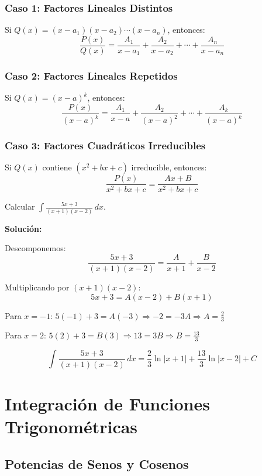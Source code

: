 \documentclass[12pt, a4paper]{book}
\begin{document}
\subsubsection{Caso 1: Factores Lineales Distintos}

Si $Q(x) = (x-a_1)(x-a_2)\cdots(x-a_n)$, entonces:
\[
\frac{P(x)}{Q(x)} = \frac{A_1}{x-a_1} + \frac{A_2}{x-a_2} + \cdots + \frac{A_n}{x-a_n}
\]

\subsubsection{Caso 2: Factores Lineales Repetidos}

Si $Q(x) = (x-a)^k$, entonces:
\[
\frac{P(x)}{(x-a)^k} = \frac{A_1}{x-a} + \frac{A_2}{(x-a)^2} + \cdots + \frac{A_k}{(x-a)^k}
\]

\subsubsection{Caso 3: Factores Cuadráticos Irreducibles}

Si $Q(x)$ contiene $(x^2+bx+c)$ irreducible, entonces:
\[
\frac{P(x)}{x^2+bx+c} = \frac{Ax+B}{x^2+bx+c}
\]

\begin{ejemplo}
Calcular $\int \frac{5x+3}{(x+1)(x-2)} \, dx$.

\textbf{Solución:}

Descomponemos:
\[
\frac{5x+3}{(x+1)(x-2)} = \frac{A}{x+1} + \frac{B}{x-2}
\]

Multiplicando por $(x+1)(x-2)$:
\[
5x+3 = A(x-2) + B(x+1)
\]

Para $x = -1$: $5(-1)+3 = A(-3) \Rightarrow -2 = -3A \Rightarrow A = \frac{2}{3}$

Para $x = 2$: $5(2)+3 = B(3) \Rightarrow 13 = 3B \Rightarrow B = \frac{13}{3}$

\[
\int \frac{5x+3}{(x+1)(x-2)} \, dx = \frac{2}{3}\ln|x+1| + \frac{13}{3}\ln|x-2| + C
\]
\end{ejemplo}

\section{Integración de Funciones Trigonométricas}

\subsection{Potencias de Senos y Cosenos}
\end{document}

